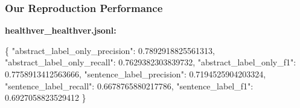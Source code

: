 \documentclass[13.5pt,aspecratio=169, xcolor=dvipsnames]{beamer}
\begin{document}
\begin{frame}[fragile]
    \onehalfspacing
        \frametitle{Our Reproduction Performance}
        \textbf{healthver\_healthver.jsonl:}
\vspace*{-1em} 
\begin{mybox}
\begin{semiverbatim}
\{
    "abstract_label_only_precision": 0.7892918825561313,
    "abstract_label_only_recall": 0.7629382303839732,
    "abstract_label_only_f1": 0.7758913412563666,
    "sentence_label_precision": 0.7194525904203324,
    "sentence_label_recall": 0.6678765880217786,
    "sentence_label_f1": 0.6927058823529412
\}\end{semiverbatim}
\end{mybox}
\end{frame}


\end{document}
